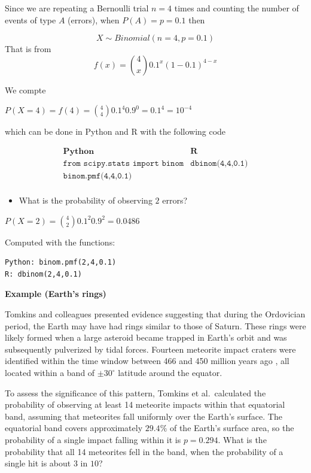 \documentclass[
]{book}
\providecommand{\tightlist}{%
  \setlength{\itemsep}{0pt}\setlength{\parskip}{0pt}}
\begin{document}
Since we are repeating a Bernoulli trial \(n=4\) times and counting the number of events of type \(A\) (errors), when \(P(A)=p=0.1\) then

\[X \sim Binomial(n=4, p=0.1)\]
That is from \[f(x)=\binom 4 x 0.1^x(1-0.1)^{4-x}\]

We compte

\(P(X=4)=f(4)=\binom 4 4 0.1^4 0.9^{0}=0.1^4=10^{-4}\)

which can be done in Python and R with the following code

\[
\begin{array}{l|l}
 \textbf{Python} & \textbf{R}  \\ 
 \texttt{from scipy.stats import binom} & \texttt{dbinom(4,4,0.1)}
\\ 
 \texttt{binom.pmf(4,4,0.1)}& \\ 
\end{array}
\]

\begin{itemize}
\tightlist
\item
  What is the probability of observing \(2\) errors?
\end{itemize}

\(P(X=2)=\binom 4 2 0.1^2 0.9^2=0.0486\)

Computed with the functions:

\begin{verbatim}
Python: binom.pmf(2,4,0.1)
R: dbinom(2,4,0.1)
\end{verbatim}

\textbf{Example (Earth's rings)}

Tomkins and colleagues presented evidence suggesting that during the Ordovician period, the Earth may have had rings similar to those of Saturn. These rings were likely formed when a large asteroid became trapped in Earth's orbit and was subsequently pulverized by tidal forces. Fourteen meteorite impact craters were identified within the time window between 466 and 450 million years ago \citep{Tomkins2024}, all located within a band of \(\pm30^\circ\) latitude around the equator.

To assess the significance of this pattern, Tomkins et al.~calculated the probability of observing at least 14 meteorite impacts within that equatorial band, assuming that meteorites fall uniformly over the Earth's surface. The equatorial band covers approximately \(29.4\%\) of the Earth's surface area, so the probability of a single impact falling within it is \(p = 0.294\). What is the probability that all 14 meteorites fell in the band, when the probability of a single hit is about \(3\) in \(10\)?
\end{document}
